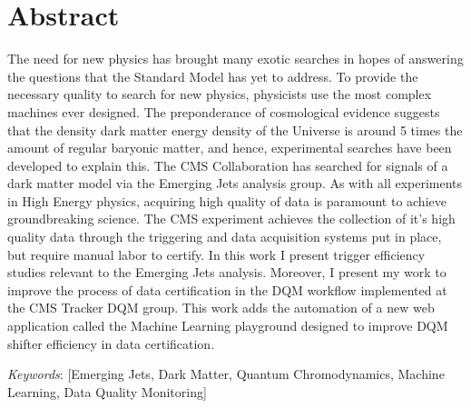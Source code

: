 \chapter{Abstract}

The need for new physics has brought many exotic searches in hopes of answering the questions that the Standard Model has yet to address.
To provide the necessary quality to search for new physics, physicists use the most complex machines ever designed.
The preponderance of cosmological evidence suggests that the density dark matter energy density of the Universe is around 5 times the amount of regular baryonic matter, and hence, experimental searches have been developed to explain this. The CMS Collaboration has searched for signals of a dark matter model via the Emerging Jets analysis group.
As with all experiments in High Energy physics, acquiring high quality of data is paramount to achieve groundbreaking science. The CMS experiment achieves the collection of it's high quality data through the triggering and data acquisition systems put in place, but require manual labor to certify.
In this work I present trigger efficiency studies relevant to the Emerging Jets analysis. Moreover, I present my work
to improve the process of data certification in the DQM workflow implemented at the CMS Tracker DQM group. This work adds the automation of a new web application called the Machine Learning playground designed to improve DQM shifter efficiency in data certification.



\vspace*{1cm}

\textit{Keywords}:  [Emerging Jets, Dark Matter, Quantum Chromodynamics, Machine Learning, Data Quality Monitoring]


